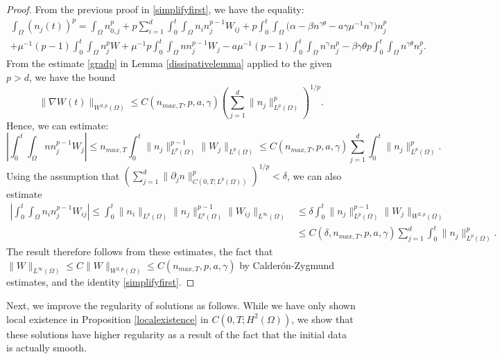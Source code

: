 \documentclass[12pt]{article}
\theoremstyle{plain}
\begin{document}
\begin{proof}
From the previous proof in \eqref{simplifyfirst}, we have the equality:
\begin{multline*}
\int_{\Omega} (n_{j}(t))^{p} = \int_{\Omega} n_{0, j}^{p} + p\sum_{i = 1}^{d} \int_{0}^{t} \int_{\Omega} n_{i}n_{j}^{p - 1} W_{ij} + p\int_{0}^{t} \int_{\Omega} \Big(\alpha - \beta n^{\gamma \theta} - a \gamma \mu^{-1}n^{\gamma}\Big) n_{j}^{p} \\
+ \mu^{-1}(p - 1) \int_{0}^{t} \int_{\Omega} n_{j}^{p}W + \mu^{-1}p \int_{0}^{t} \int_{\Omega} nn^{p - 1}_{j}W_{j} - a\mu^{-1}(p - 1) \int_{0}^{t} \int_{\Omega} n^{\gamma} n_{j}^{p} - \beta\gamma \theta p \int_{0}^{t} \int_{\Omega} n^{\gamma \theta} n^{p}_{j}.
\end{multline*}
From the estimate \eqref{gradp} in Lemma \ref{dissipativelemma} applied to the given $p > d$, we have the bound
\begin{equation*}
\|\nabla W(t)\|_{W^{2, p}(\Omega)} \le C(n_{max, T}, p, a, \gamma) \left(\sum_{j = 1}^{d} \|n_{j}\|^{p}_{L^{p}(\Omega)}\right)^{1/p}.
\end{equation*}
Hence, we can estimate:
\begin{equation*}
\left|\int_{0}^{t} \int_{\Omega} nn_{j}^{p - 1} W_{j}\right| \le n_{max, T} \int_{0}^{t} \|n_{j}\|_{L^{p}(\Omega)}^{p - 1} \|W_{j}\|_{L^{p}(\Omega)} \le C(n_{max, T}, p, a, \gamma) \sum_{j = 1}^{d} \int_{0}^{t} \|n_{j}\|_{L^{p}(\Omega)}^{p}.
\end{equation*}
Using the assumption that $\displaystyle \left(\sum_{j = 1}^{d} \|\partial_{j} n\|^{p}_{C(0, T; L^{p}(\Omega))}\right)^{1/p} < \delta$, we can also estimate
\begin{align*}
\left|\int_{0}^{t} \int_{\Omega} n_{i} n_{j}^{p - 1} W_{ij} \right| \le \int_{0}^{t} \|n_{i}\|_{L^{p}(\Omega)} \|n_{j}\|_{L^{p}(\Omega)}^{p - 1} \|W_{ij}\|_{L^{\infty}(\Omega)} &\le \delta \int_{0}^{t} \|n_{j}\|^{p - 1}_{L^{p}(\Omega)} \|W_{j}\|_{W^{2, p}(\Omega)} \\
&\le C(\delta, n_{max, T}, p, a, \gamma) \sum_{j = 1}^{d} \int_{0}^{t} \|n_{j}\|_{L^{p}(\Omega)}^{p}.
\end{align*}
The result therefore follows from these estimates, the fact that $\|W\|_{L^{\infty}(\Omega)} \le C\|W\|_{W^{2, p}(\Omega)} \le C(n_{max, T}, p, a, \gamma)$ by Calder\'{o}n-Zygmund estimates, and the identity \eqref{simplifyfirst}.
\end{proof}

Next, we improve the regularity of solutions as follows. While we have only shown local existence in Proposition \ref{localexistence} in $C(0, T; H^{2}(\Omega))$, we show that these solutions have higher regularity as a result of the fact that the initial data is actually smooth.
\end{document}
